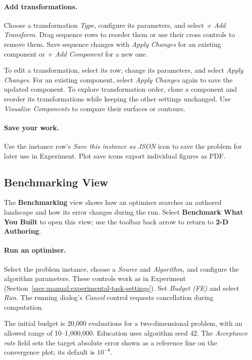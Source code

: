 \documentclass[journal,onecolumn]{IEEEtran}
\begin{document}
\paragraph{Add transformations.}
Choose a transformation \emph{Type}, configure its parameters, and select \emph{+ Add Transform}. Drag sequence rows to reorder them or use their cross controls to remove them. Save sequence changes with \emph{Apply Changes} for an existing component or \emph{+ Add Component} for a new one.

To edit a transformation, select its row, change its parameters, and select \emph{Apply Changes}. For an existing component, select \emph{Apply Changes} again to save the updated component. To explore transformation order, clone a component and reorder its transformations while keeping the other settings unchanged. Use \emph{Visualize Components} to compare their surfaces or contours.

\paragraph{Save your work.}
Use the instance row's \emph{Save this instance as JSON} icon to save the problem for later use in Experiment. Plot save icons export individual figures as PDF.

\subsection{Benchmarking View}
\label{ssec:manual:educational-benchmarking}

The \textbf{Benchmarking} view shows how an optimiser searches an authored landscape and how its error changes during the run. Select \textbf{Benchmark What You Built} to open this view; use the toolbar back arrow to return to \textbf{2-D Authoring}.

\paragraph{Run an optimiser.}
Select the problem instance, choose a \emph{Source} and \emph{Algorithm}, and configure the algorithm parameters. These controls work as in Experiment (Section~\ref{ssec:manual:experimental-task-settings}). Set \emph{Budget (FE)} and select \emph{Run}. The running dialog's \emph{Cancel} control requests cancellation during computation.

The initial budget is 20,000 evaluations for a two-dimensional problem, with an allowed range of 10--1,000,000. Education uses algorithm seed 42. The \emph{Acceptance rate} field sets the target absolute error shown as a reference line on the convergence plot; its default is $10^{-8}$.
\end{document}
